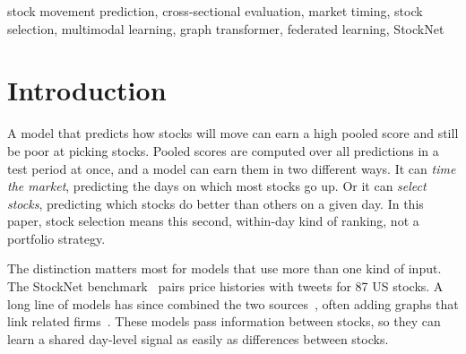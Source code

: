 \documentclass[conference]{IEEEtran}
\begin{document}
\begin{IEEEkeywords}
stock movement prediction, cross-sectional evaluation, market timing, stock
selection, multimodal learning, graph transformer, federated learning, StockNet
\end{IEEEkeywords}

\section{Introduction}

A model that predicts how stocks will move can earn a high pooled score and still be
poor at picking stocks. Pooled scores are computed over all predictions in a test
period at once, and a model can earn them in two different ways. It can \emph{time the
market}, predicting the days on which most stocks go up. Or it can \emph{select
stocks}, predicting which stocks do better than others on a given day. In this paper,
stock selection means this second, within-day kind of ranking, not a portfolio
strategy.

The distinction matters most for models that use more than one kind of input. The
StockNet benchmark~\cite{xu2018stocknet} pairs price histories with tweets for 87 US
stocks. A long line of models has since combined the two
sources~\cite{feng2019advalstm,sawhney2020mansf,sawhney2021fast,ang2022guided}, often
adding graphs that link related
firms~\cite{chen2018gcn,feng2019rsr,cheng2022multimodality,wang2021review}. These
models pass information between stocks, so they can learn a shared day-level signal as
easily as differences between stocks.
\end{document}
